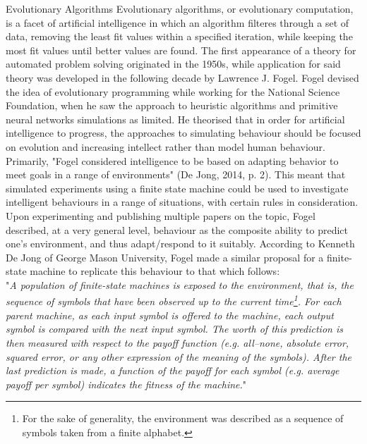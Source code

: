 \documentclass[12pt,a4paper]{article}
\makeatletter
\renewcommand\subsection{\@startsection {subsection}{1}{2mm}
                               {3pt plus 2pt minus 1pt}
                               {3pt plus 0pt}
                               {\normalfont\bfseries}}
\makeatother
\begin{document}
\subsection{Evolutionary Algorithms}
Evolutionary algorithms, or evolutionary computation, is a facet of artificial intelligence in which an algorithm filteres through a set of data, removing the least fit values within a specified iteration, while keeping the most fit values until better values are found. The first appearance of a theory for automated problem solving originated in the 1950s, while application for said theory was developed in the following decade by Lawrence J. Fogel. Fogel devised the idea of evolutionary programming while working for the National Science Foundation, when he saw the approach to heuristic algorithms and primitive neural networks simulations as limited. He theorised that in order for artificial intelligence to progress, the approaches to simulating behaviour should be focused on evolution and increasing intellect rather than model human behaviour. Primarily, "Fogel considered intelligence to be based on adapting behavior to meet goals in a range of environments" (De Jong, 2014, p. 2). This meant that simulated experiments using a finite state machine could be used to investigate intelligent behaviours in a range of situations, with certain rules in consideration. Upon experimenting and publishing multiple papers on the topic, Fogel described, at a very general level, behaviour as the composite ability to predict one's environment, and thus adapt/respond to it suitably. According to Kenneth De Jong of George Mason University, Fogel made a similar proposal for a finite-state machine to replicate this behaviour to that which follows: \\

\noindent
"\textit{A population of finite-state machines is exposed to the environment, that is, the sequence of symbols that have been observed up to the current time\footnote{For the sake of generality, the environment was described as a sequence of symbols taken from a finite alphabet.}. For each parent machine, as each input symbol is offered to the machine, each output symbol is compared with the next input symbol. The worth of this prediction is then measured with respect to the payoff function (e.g. all–none, absolute error, squared error, or any other expression of the meaning of the symbols). After the last prediction is made, a function of the payoff for each symbol (e.g. average payoff per symbol) indicates the fitness of the machine.}" \\
\end{document}

